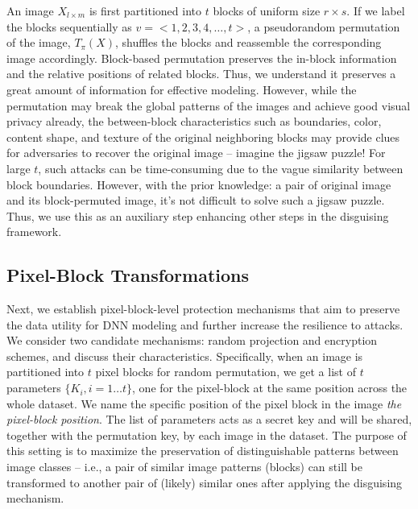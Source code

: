 \documentclass[conference]{IEEEtran}
\begin{document}
An image $X_{l \times m}$ is first partitioned into $t$ blocks of uniform size $ r\times s$. If we label the blocks sequentially as $v= <1,2,3,4, \dots, t>$, a pseudorandom permutation of the image, $T_{\pi}(X)$, shuffles the blocks and reassemble the corresponding image accordingly. Block-based permutation preserves the in-block information and the relative positions of related blocks. Thus, we understand it preserves a great amount of  information for effective modeling. However, while the permutation may break the global patterns of the images and achieve good visual privacy already, the between-block characteristics such as boundaries, color, content shape, and texture of the original neighboring blocks may provide clues for adversaries to recover the original image -- imagine the jigsaw puzzle!  For large $t$, such attacks can be time-consuming due to the vague similarity between block boundaries. However, with the prior knowledge: a pair of original image and its block-permuted image, it's not difficult to solve such a jigsaw puzzle. Thus, we use this as an auxiliary step enhancing other steps in the disguising framework. %

\subsection{Pixel-Block Transformations}\label{subsubsec:tech_gdp}
Next, we establish pixel-block-level protection mechanisms that aim to preserve the data utility for DNN modeling and further increase the resilience to attacks. We consider two candidate mechanisms: random projection and encryption schemes, and discuss their characteristics. %
Specifically, when an image is partitioned into $t$ pixel blocks for random permutation, we get a list of $t$ parameters $\{K_i, i=1\dots t\}$, one for the pixel-block at the same position across the whole dataset. We name the specific position of the pixel block in the image \emph{the pixel-block position}. The list of parameters acts as a secret key and will be shared, together with the permutation key, by each image in the dataset. The purpose of this setting is to maximize the preservation of distinguishable patterns between image classes -- i.e., a pair of similar image patterns (blocks) can still be transformed to another pair of (likely) similar ones after applying the disguising mechanism.  
\end{document}
